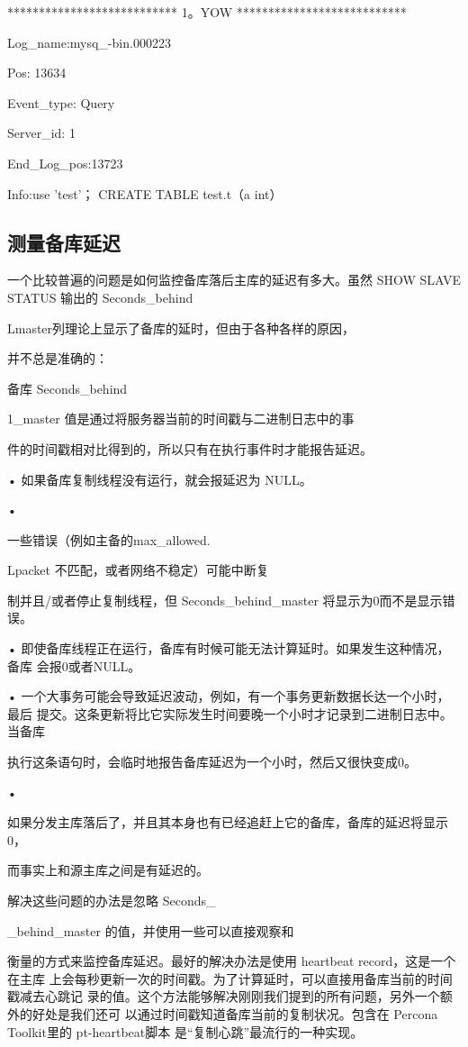 *************************** 1。YOW ***************************

Log\_name:mysq\_-bin.000223

Pos: 13634

Event\_type: Query

Server\_id: 1

End\_Log\_pos:13723

Info:use 'test'； CREATE TABLE test.t（a int）

\subsection{测量备库延迟}
一个比较普遍的问题是如何监控备库落后主库的延迟有多大。虽然 SHOW SLAVE STATUS
输出的 Seconds\_behind

Lmaster列理论上显示了备库的延时，但由于各种各样的原因，

并不总是准确的：

备库 Seconds\_behind

1\_master 值是通过将服务器当前的时间戳与二进制日志中的事

件的时间戳相对比得到的，所以只有在执行事件时才能报告延迟。

• 如果备库复制线程没有运行，就会报延迟为 NULL。

•

一些错误（例如主备的max\_allowed.

Lpacket 不匹配，或者网络不稳定）可能中断复

制并且/或者停止复制线程，但 Seconds\_behind\_master 将显示为0而不是显示错误。

• 即使备库线程正在运行，备库有时候可能无法计算延时。如果发生这种情况，备库
会报0或者NULL。

• 一个大事务可能会导致延迟波动，例如，有一个事务更新数据长达一个小时，最后
提交。这条更新将比它实际发生时间要晚一个小时才记录到二进制日志中。当备库

执行这条语句时，会临时地报告备库延迟为一个小时，然后又很快变成0。

•

如果分发主库落后了，并且其本身也有已经追赶上它的备库，备库的延迟将显示0，

而事实上和源主库之间是有延迟的。

解决这些问题的办法是忽略 Seconds\_

\_behind\_master 的值，并使用一些可以直接观察和

衡量的方式来监控备库延迟。最好的解决办法是使用 heartbeat record，这是一个在主库
上会每秒更新一次的时间戳。为了计算延时，可以直接用备库当前的时间戳减去心跳记
录的值。这个方法能够解决刚刚我们提到的所有问题，另外一个额外的好处是我们还可
以通过时间戳知道备库当前的复制状况。包含在 Percona Toolkit里的 pt-heartbeat脚本
是“复制心跳”最流行的一种实现。

